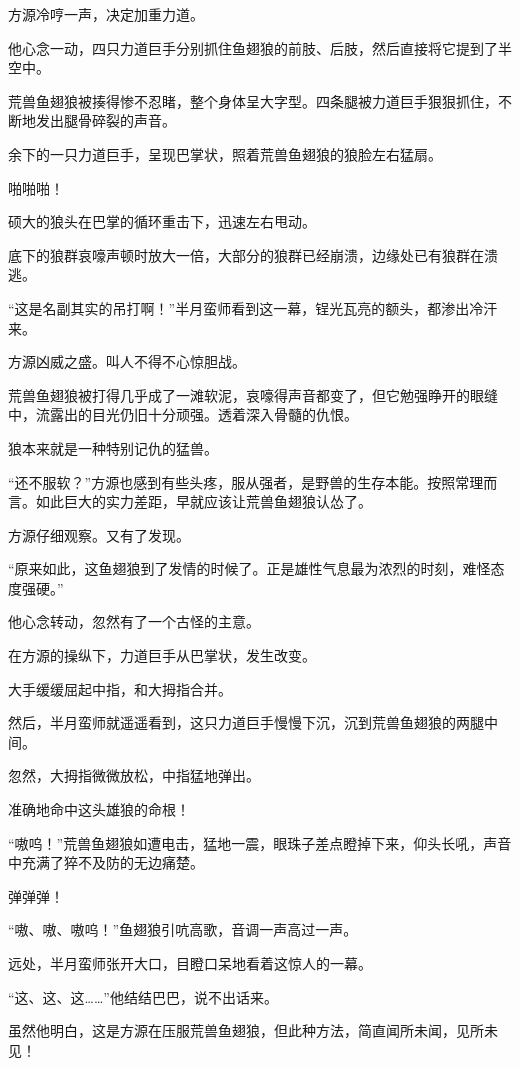 \begin{this_body}
方源冷哼一声，决定加重力道。

他心念一动，四只力道巨手分别抓住鱼翅狼的前肢、后肢，然后直接将它提到了半空中。

荒兽鱼翅狼被揍得惨不忍睹，整个身体呈大字型。四条腿被力道巨手狠狠抓住，不断地发出腿骨碎裂的声音。

余下的一只力道巨手，呈现巴掌状，照着荒兽鱼翅狼的狼脸左右猛扇。

啪啪啪！

硕大的狼头在巴掌的循环重击下，迅速左右甩动。

底下的狼群哀嚎声顿时放大一倍，大部分的狼群已经崩溃，边缘处已有狼群在溃逃。

“这是名副其实的吊打啊！”半月蛮师看到这一幕，锃光瓦亮的额头，都渗出冷汗来。

方源凶威之盛。叫人不得不心惊胆战。

荒兽鱼翅狼被打得几乎成了一滩软泥，哀嚎得声音都变了，但它勉强睁开的眼缝中，流露出的目光仍旧十分顽强。透着深入骨髓的仇恨。

狼本来就是一种特别记仇的猛兽。

“还不服软？”方源也感到有些头疼，服从强者，是野兽的生存本能。按照常理而言。如此巨大的实力差距，早就应该让荒兽鱼翅狼认怂了。

方源仔细观察。又有了发现。

“原来如此，这鱼翅狼到了发情的时候了。正是雄性气息最为浓烈的时刻，难怪态度强硬。”

他心念转动，忽然有了一个古怪的主意。

在方源的操纵下，力道巨手从巴掌状，发生改变。

大手缓缓屈起中指，和大拇指合并。

然后，半月蛮师就遥遥看到，这只力道巨手慢慢下沉，沉到荒兽鱼翅狼的两腿中间。

忽然，大拇指微微放松，中指猛地弹出。

准确地命中这头雄狼的命根！

“嗷呜！”荒兽鱼翅狼如遭电击，猛地一震，眼珠子差点瞪掉下来，仰头长吼，声音中充满了猝不及防的无边痛楚。

弹弹弹！

“嗷、嗷、嗷呜！”鱼翅狼引吭高歌，音调一声高过一声。

远处，半月蛮师张开大口，目瞪口呆地看着这惊人的一幕。

“这、这、这……”他结结巴巴，说不出话来。

虽然他明白，这是方源在压服荒兽鱼翅狼，但此种方法，简直闻所未闻，见所未见！


\end{this_body}

